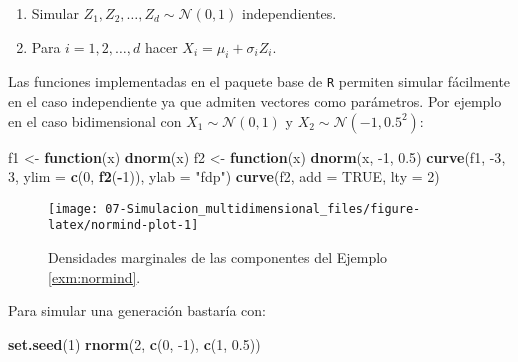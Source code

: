 \documentclass[
]{book}
\newenvironment{Shaded}{\begin{snugshade}}{\end{snugshade}}
\newcommand{\ControlFlowTok}[1]{\textcolor[rgb]{0.13,0.29,0.53}{\textbf{#1}}}
\newcommand{\DataTypeTok}[1]{\textcolor[rgb]{0.13,0.29,0.53}{#1}}
\newcommand{\DecValTok}[1]{\textcolor[rgb]{0.00,0.00,0.81}{#1}}
\newcommand{\FloatTok}[1]{\textcolor[rgb]{0.00,0.00,0.81}{#1}}
\newcommand{\KeywordTok}[1]{\textcolor[rgb]{0.13,0.29,0.53}{\textbf{#1}}}
\newcommand{\NormalTok}[1]{#1}
\newcommand{\OperatorTok}[1]{\textcolor[rgb]{0.81,0.36,0.00}{\textbf{#1}}}
\newcommand{\OtherTok}[1]{\textcolor[rgb]{0.56,0.35,0.01}{#1}}
\newcommand{\StringTok}[1]{\textcolor[rgb]{0.31,0.60,0.02}{#1}}
\theoremstyle{break}
\theoremstyle{definition}
\theoremstyle{definition}
\theoremstyle{definition}
\theoremstyle{remark}
\begin{document}
\begin{enumerate}
\def\labelenumi{\arabic{enumi}.}
\item
  Simular \(Z_1, Z_2, \ldots, Z_d \sim \mathcal{N} \left( 0, 1 \right)\) independientes.
\item
  Para \(i = 1, 2, \ldots, d\) hacer \(X_i = \mu_i + \sigma_i Z_i\).
\end{enumerate}

Las funciones implementadas en el paquete base de \texttt{R} permiten simular fácilmente en el caso independiente ya que admiten vectores como parámetros.
Por ejemplo en el caso bidimensional con \(X_1 \sim \mathcal{N}\left( 0, 1\right)\) y \(X_2 \sim \mathcal{N}\left( -1, 0.5^2 \right)\):



\begin{Shaded}
\begin{Highlighting}[]
\NormalTok{f1 <-}\StringTok{ }\ControlFlowTok{function}\NormalTok{(x) }\KeywordTok{dnorm}\NormalTok{(x)}
\NormalTok{f2 <-}\StringTok{ }\ControlFlowTok{function}\NormalTok{(x) }\KeywordTok{dnorm}\NormalTok{(x, }\DecValTok{-1}\NormalTok{, }\FloatTok{0.5}\NormalTok{)}
\KeywordTok{curve}\NormalTok{(f1, }\DecValTok{-3}\NormalTok{, }\DecValTok{3}\NormalTok{, }\DataTypeTok{ylim =} \KeywordTok{c}\NormalTok{(}\DecValTok{0}\NormalTok{, }\KeywordTok{f2}\NormalTok{(}\OperatorTok{-}\DecValTok{1}\NormalTok{)), }\DataTypeTok{ylab =} \StringTok{"fdp"}\NormalTok{)}
\KeywordTok{curve}\NormalTok{(f2, }\DataTypeTok{add =} \OtherTok{TRUE}\NormalTok{, }\DataTypeTok{lty =} \DecValTok{2}\NormalTok{)}
\end{Highlighting}
\end{Shaded}

\begin{figure}[!htb]

{\centering \texttt{[image: 07-Simulacion\_multidimensional\_files/figure-latex/normind-plot-1]} 

}

\caption{Densidades marginales de las componentes del Ejemplo \ref{exm:normind}.}\label{fig:normind-plot}
\end{figure}

Para simular una generación bastaría con:

\begin{Shaded}
\begin{Highlighting}[]
\KeywordTok{set.seed}\NormalTok{(}\DecValTok{1}\NormalTok{)}
\KeywordTok{rnorm}\NormalTok{(}\DecValTok{2}\NormalTok{, }\KeywordTok{c}\NormalTok{(}\DecValTok{0}\NormalTok{, }\DecValTok{-1}\NormalTok{), }\KeywordTok{c}\NormalTok{(}\DecValTok{1}\NormalTok{, }\FloatTok{0.5}\NormalTok{))}
\end{Highlighting}
\end{Shaded}
\end{document}
